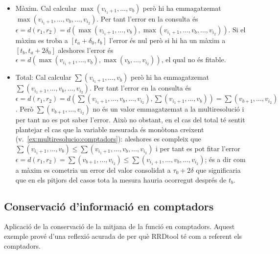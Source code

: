 \begin{itemize}

\item Màxim. Cal calcular $\max(v_{i_1+1},\dotsc,v_{b})$ però hi ha
  emmagatzemat $\max(v_{i_1+1},\dotsc,v_{b},\dotsc,v_{i_2})$.  Per
  tant l'error en la consulta és $\epsilon=d(r_1,r_2)=
  d(\max(v_{i_1+1},\dotsc,v_{b}),\max(v_{i_1+1},\dotsc,v_{b},\dotsc,v_{i_2}))$. Si
  el màxim es troba a $[t_a+\delta_0,t_b]$ l'error és nul però si hi
  ha un màxim a $[t_b,t_a+2\delta_0]$ aleshores l'error és
  $\epsilon=d(\max(v_{i_1+1},\dotsc,v_{b}),\max(v_{b},\dotsc,v_{i_2}))$,
  el qual no és fitable.
  
\item Total: Cal calcular $\sum(v_{i_1+1},\dotsc,v_{b})$ però hi ha
  emmagatzemat $\sum(v_{i_1+1},\dotsc,v_{b},\dotsc,v_{i_2})$. Per tant
  l'error en la consulta és $\epsilon=d(r_1,r_2)=d(
  \sum(v_{i_1+1},\dotsc,v_{b},\dotsc,v_{i_2}),\sum(v_{i_1+1},\dotsc,v_{b}))
  = \sum(v_{b+1},\dotsc,v_{i_2})$. Però $\sum(v_{b+1},\dotsc,v_{i_2})$
  no és un valor emmagatzemat a la multiresolució i per tant no es pot
  saber l'error. Això no obstant, en el cas del total té sentit
  plantejar el cas que la variable mesurada és monòtona creixent
  (v.~\autoref{ex:multiresolucio:comptadors}): aleshores es compleix
  que $\sum(v_{i_1+1},\dotsc,v_{b}) \leq
  \sum(v_{i_1+1},\dotsc,v_{b},\dotsc,v_{i_2})$ i per tant es pot fitar
  l'error $\epsilon=d(r_1,r_2) = \sum(v_{b+1},\dotsc,v_{i_2}) \leq  
  \sum(v_{i_1+1},\dotsc,v_{b},\dotsc,v_{i_2})$; és a dir com a màxim
  es cometria un error del valor consolidat a $\tau_0+2\delta$ que
  significaria que en els pitjors del casos tota la mesura hauria
  ocorregut després de $t_b$.


\end{itemize}






\subsection{Conservació d'informació en comptadors}
  \label{ex:multiresolucio:comptadors}

Aplicació de la conservació de la mitjana de la funció
  en comptadors.
  Aquest exemple prové d'una reflexió acurada de per què RRDtool té
  com a referent els comptadors.





